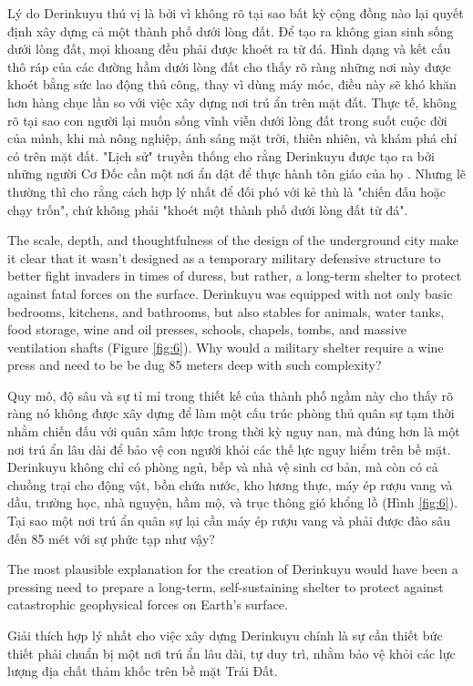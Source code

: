 \documentclass[10pt,twocolumn,letterpaper]{article}
\begin{document}
Lý do Derinkuyu thú vị là bởi vì không rõ tại sao bất kỳ cộng đồng nào lại quyết định xây dựng cả một thành phố dưới lòng đất. Để tạo ra không gian sinh sống dưới lòng đất, mọi khoang đều phải được khoét ra từ đá. Hình dạng và kết cấu thô ráp của các đường hầm dưới lòng đất cho thấy rõ ràng những nơi này được khoét bằng sức lao động thủ công, thay vì dùng máy móc, điều này sẽ khó khăn hơn hàng chục lần so với việc xây dựng nơi trú ẩn trên mặt đất. Thực tế, không rõ tại sao con người lại muốn sống vĩnh viễn dưới lòng đất trong suốt cuộc đời của mình, khi mà nông nghiệp, ánh sáng mặt trời, thiên nhiên, và khám phá chỉ có trên mặt đất. "Lịch sử" truyền thống cho rằng Derinkuyu được tạo ra bởi những người Cơ Đốc cần một nơi ẩn dật để thực hành tôn giáo của họ \cite{53}. Nhưng lẽ thường thì cho rằng cách hợp lý nhất để đối phó với kẻ thù là "chiến đấu hoặc chạy trốn", chứ không phải "khoét một thành phố dưới lòng đất từ đá".

The scale, depth, and thoughtfulness of the design of the underground city make it clear that it wasn't designed as a temporary military defensive structure to better fight invaders in times of duress, but rather, a long-term shelter to protect against fatal forces on the surface. Derinkuyu was equipped with not only basic bedrooms, kitchens, and bathrooms, but also stables for animals, water tanks, food storage, wine and oil presses, schools, chapels, tombs, and massive ventilation shafts (Figure \ref{fig:6}). Why would a military shelter require a wine press and need to be be dug 85 meters deep with such complexity?

Quy mô, độ sâu và sự tỉ mỉ trong thiết kế của thành phố ngầm này cho thấy rõ ràng nó không được xây dựng để làm một cấu trúc phòng thủ quân sự tạm thời nhằm chiến đấu với quân xâm lược trong thời kỳ nguy nan, mà đúng hơn là một nơi trú ẩn lâu dài để bảo vệ con người khỏi các thế lực nguy hiểm trên bề mặt. Derinkuyu không chỉ có phòng ngủ, bếp và nhà vệ sinh cơ bản, mà còn có cả chuồng trại cho động vật, bồn chứa nước, kho lương thực, máy ép rượu vang và dầu, trường học, nhà nguyện, hầm mộ, và trục thông gió khổng lồ (Hình \ref{fig:6}). Tại sao một nơi trú ẩn quân sự lại cần máy ép rượu vang và phải được đào sâu đến 85 mét với sự phức tạp như vậy?

The most plausible explanation for the creation of Derinkuyu would have been a pressing need to prepare a long-term, self-sustaining shelter to protect against catastrophic geophysical forces on Earth's surface.

Giải thích hợp lý nhất cho việc xây dựng Derinkuyu chính là sự cần thiết bức thiết phải chuẩn bị một nơi trú ẩn lâu dài, tự duy trì, nhằm bảo vệ khỏi các lực lượng địa chất thảm khốc trên bề mặt Trái Đất.
\end{document}
